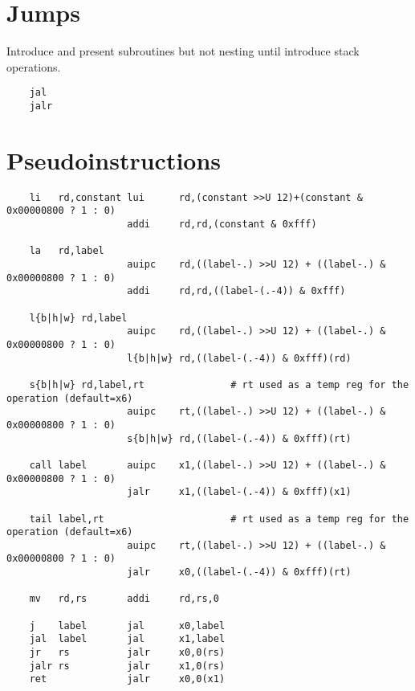 \section{Jumps}

Introduce and present subroutines but not nesting until introduce stack operations.

\label{uguide:jal}
\label{uguide:jalr}
{\small
\begin{verbatim}
    jal
    jalr
\end{verbatim}
}



\section{Pseudoinstructions}

{\small
\begin{verbatim}
    li   rd,constant lui      rd,(constant >>U 12)+(constant & 0x00000800 ? 1 : 0)
                     addi     rd,rd,(constant & 0xfff)

    la   rd,label
                     auipc    rd,((label-.) >>U 12) + ((label-.) & 0x00000800 ? 1 : 0)
                     addi     rd,rd,((label-(.-4)) & 0xfff)

    l{b|h|w} rd,label
                     auipc    rd,((label-.) >>U 12) + ((label-.) & 0x00000800 ? 1 : 0)
                     l{b|h|w} rd,((label-(.-4)) & 0xfff)(rd)

    s{b|h|w} rd,label,rt               # rt used as a temp reg for the operation (default=x6)
                     auipc    rt,((label-.) >>U 12) + ((label-.) & 0x00000800 ? 1 : 0)
                     s{b|h|w} rd,((label-(.-4)) & 0xfff)(rt)

    call label       auipc    x1,((label-.) >>U 12) + ((label-.) & 0x00000800 ? 1 : 0)
                     jalr     x1,((label-(.-4)) & 0xfff)(x1)

    tail label,rt                      # rt used as a temp reg for the operation (default=x6)
                     auipc    rt,((label-.) >>U 12) + ((label-.) & 0x00000800 ? 1 : 0)
                     jalr     x0,((label-(.-4)) & 0xfff)(rt)

    mv   rd,rs       addi     rd,rs,0
 
    j    label       jal      x0,label
    jal  label       jal      x1,label
    jr   rs          jalr     x0,0(rs)
    jalr rs          jalr     x1,0(rs)
    ret              jalr     x0,0(x1)
\end{verbatim}
}

